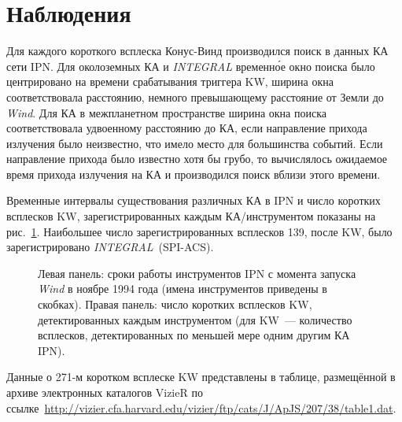 \section{Наблюдения}\label{sec:IPN_catalog_obserations}
Для каждого короткого всплеска Конус-Винд производился поиск в данных КА сети IPN. 
Для околоземных КА и \textit{INTEGRAL} временн\'{о}е окно поиска было центрировано 
на времени срабатывания триггера KW, ширина окна соответствовала расстоянию, 
немного превышающему расстояние от Земли до \textit{Wind}. Для КА в межпланетном 
пространстве ширина окна поиска соответствовала удвоенному расстоянию до КА, если 
направление прихода излучения было неизвестно, что имело место для большинства событий. 
Если направление прихода было известно хотя бы грубо, то вычислялось ожидаемое время 
прихода излучения на КА и производился поиск вблизи этого времени.

Временные интервалы существования различных КА в IPN и число коротких всплесков 
KW, зарегистрированных каждым КА/инструментом показаны на рис.~\ref{img:Mission_timeline}. 
Наибольшее число зарегистрированных всплесков 139, после KW, 
было зарегистрировано \textit{INTEGRAL}~(SPI-ACS).

\begin{figure}[h]
    \caption[Время работы различных КА IPN]
  {Левая панель: сроки работы инструментов IPN с момента запуска \textit{Wind} в ноябре 1994 года 
  (имена инструментов приведены в скобках). Правая панель: число коротких всплесков KW,
  детектированных каждым инструментом (для KW~--- количество всплесков, 
  детектированных по меньшей мере одним другим КА IPN).}
  \label{img:Mission_timeline}  
\end{figure}

Данные о 271-м коротком всплеске KW представлены в таблице, размещённой 
в архиве электронных каталогов VizieR по 
ссылке~\url{http://vizier.cfa.harvard.edu/vizier/ftp/cats/J/ApJS/207/38/table1.dat}.


